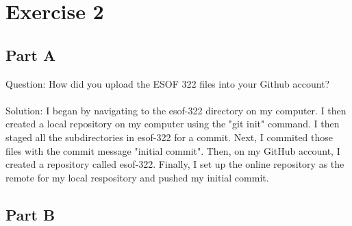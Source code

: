 \documentclass{article}
\begin{document}
\newpage

\section*{Exercise 2}

\subsection*{Part A}

Question: How did you upload the ESOF 322 files into your Github account? \\\\
Solution: I began by navigating to the esof-322 directory on my computer. I then created a local repository on my computer using the "git init" command. 
I then staged all the subdirectories in esof-322 for a commit. Next, I commited those files with the commit message "initial commit".
Then, on my GitHub account, I created a repository called esof-322.
Finally, I set up the online repository as the remote for my local respository and pushed my initial commit.

\subsection*{Part B}
\end{document}
